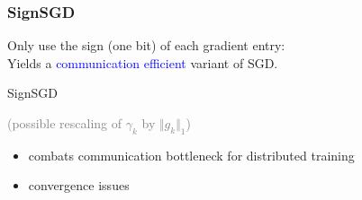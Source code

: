 \documentclass[aspectratio=149]{beamer}
\begin{document}
\begin{frame}
  \frametitle{SignSGD}
  Only use the sign (one bit) of each gradient entry: \\
  Yields a \textcolor{blue}{communication efficient} variant of SGD.
  \begin{algorithm}[H]
    \caption{SignSGD}\label{label:}
    \begin{algorithmic}[1]
      \Endfor
    \end{algorithmic}
  \end{algorithm}
  \textcolor{gray}{(possible rescaling of $\gamma_k$ by $\Vert g_k \Vert_1$)}

  \begin{itemize}
    \item combats communication bottleneck for distributed training
    \item convergence issues
  \end{itemize}


\end{frame}
\end{document}
